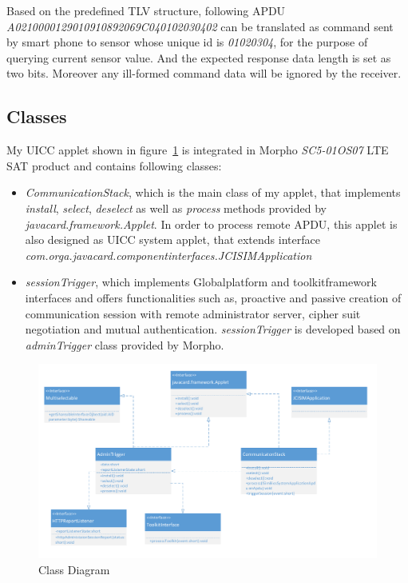 Based on the predefined TLV structure, following APDU \emph{A0210000129010910892069C040102030402}\label{remote-apdu-example} can be translated as command sent by smart phone to sensor whose unique id is \emph{01020304}, for the purpose of querying current sensor value. And the expected response data length is set as two bits.  Moreover any ill-formed command data will be ignored by the receiver.

\subsection{Classes}\sloppy
My UICC applet shown in figure~\ref{fig:class} is integrated in Morpho \emph{SC5-01OS07} LTE SAT product and contains following classes:
 \begin{itemize}
  \item  \emph{CommunicationStack}, which is the main class of my applet, that implements \emph{install}, \emph{select}, \emph{deselect} as well as \emph{process} methods provided by \emph{javacard.framework.Applet}. In order to process remote APDU, this applet is also designed as UICC system applet, that extends interface \emph{com.orga.javacard.componentinterfaces.JCISIMApplication}
  \item  \emph{sessionTrigger}, which implements Globalplatform  and toolkitframework interfaces and offers functionalities such as, proactive and passive creation of communication session with remote administrator server, cipher suit negotiation and mutual authentication. \emph{sessionTrigger} is developed based on \emph{adminTrigger} class provided by Morpho.
\end{itemize}

\begin{figure}[!htbp]
	\centering
	\includegraphics[width=1.0\textwidth]{class}
		\caption{Class Diagram}
	\label{fig:class}
\end{figure}

